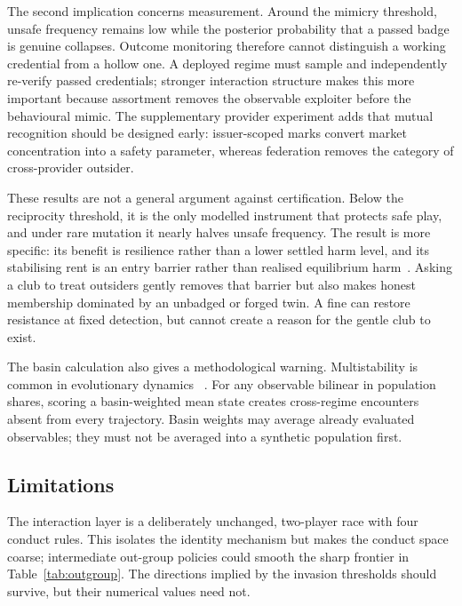 \documentclass[a4paper,fleqn,longmktitle]{cas-sc}
\theoremstyle{plain}
\theoremstyle{definition}
\begin{document}
The second implication concerns measurement. Around the mimicry threshold,
unsafe frequency remains low while the posterior probability that a passed
badge is genuine collapses. Outcome monitoring therefore cannot distinguish a
working credential from a hollow one. A deployed regime must sample and
independently re-verify passed credentials; stronger interaction structure
makes this more important because assortment removes the observable exploiter
before the behavioural mimic. The supplementary provider experiment adds that
mutual recognition should be designed early: issuer-scoped marks convert
market concentration into a safety parameter, whereas federation removes the
category of cross-provider outsider.

These results are not a general argument against certification. Below the
reciprocity threshold, it is the only modelled instrument that protects safe
play, and under rare mutation it nearly halves unsafe frequency. The result is
more specific: its benefit is resilience rather than a lower settled harm
level, and its stabilising rent is an entry barrier rather than realised
equilibrium harm~\citep{leland1979quacks}. Asking a club to treat outsiders
gently removes that barrier but also makes honest membership dominated by an
unbadged or forged twin. A fine can restore resistance at fixed detection, but
cannot create a reason for the gentle club to exist.

The basin calculation also gives a methodological warning. Multistability is
common in evolutionary dynamics
~\citep{hofbauer1998evolutionary,hofbauer2003evolutionary,sandholm2010population}.
For any observable bilinear in population shares, scoring a basin-weighted
mean state creates cross-regime encounters absent from every trajectory. Basin
weights may average already evaluated observables; they must not be averaged
into a synthetic population first.

\subsection{Limitations}
\label{sec:limitations}

The interaction layer is a deliberately unchanged, two-player race with four
conduct rules. This isolates the identity mechanism but makes the conduct
space coarse; intermediate out-group policies could smooth the sharp frontier
in Table~\ref{tab:outgroup}. The directions implied by the invasion thresholds
should survive, but their numerical values need not.
\end{document}
